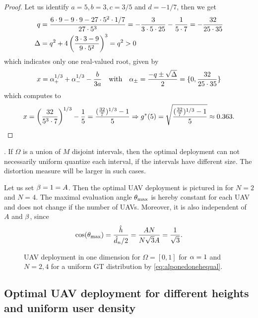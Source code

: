 \documentclass[smallabstract,smallcaptions]{dccpaper}
\newenvironment{remark}{\par\vspace{1.5ex}\noindent{\em Remark\/}.}{\par\vspace{1.5ex}}
\begin{document}
\begin{proof}
%
Let us identify $a=5,b=3,c=3/5$ and $d=-1/7$, then we get
%
\begin{align}
  q&=\frac{6\cdot 9-9\cdot 9 - 27\cdot 5^2\cdot1/7}{27\cdot 5^3}
  =-\frac{3}{3\cdot 5\cdot 25} -\frac{1}{5\cdot 7}=-\frac{32}{25\cdot35}\\
  \Delta&=q^2 + 4 \left(\frac{3\cdot 3 -9}{9\cdot 5^2}\right)^3=q^2>0
\end{align}
%
which indicates only one real-valued root, given by
%
\begin{align}
  x=\alpha_+^{1/3}+\alpha_-^{1/3}-\frac{b}{3a} 
  \quad\text{with}\quad  \alpha_{\pm}=\frac{-q\pm\sqrt{\Delta}}{2} = \{0, \frac{32}{25\cdot 35} \}
\end{align}
%
which computes to
%
\begin{align}
  x=\left( \frac{32}{5^3\cdot 7}\right)^{1/3}- \frac{1}{5}
  =\frac{(\frac{32}{7})^{1/3}-1}{5} \Rightarrow g^*(5)=\sqrt{\frac{(\frac{32}{7})^{1/3}-1}{5}} \approx 0.363.
\end{align}
%
\end{proof}
\color{black}
%
\begin{remark}
  If $\Omega$ is a union of $M$ disjoint intervals, then the optimal deployment can not necessarily uniform quantize
  each interval, if the intervals have different size. 
  The distortion measure will be larger in such cases.
\end{remark}

Let us set $\beta=1=A$. Then the optimal UAV deployment is pictured in  for $N=2$ and $N=4$. The
maximal evaluation angle $\theta_{\text{max}}$ is hereby constant for each UAV and does not change if the number of UAVs.
Moreover, it is also independent of $A$ and $\beta$, since
%
\begin{align}
  \cos(\theta_\text{max})= \frac{\hat{h}}{\hat{d}_n/2}= \frac{AN}{N\sqrt{3}A}= \frac{1}{\sqrt{3}}.
\end{align}
% 
\begin{figure}
    \centering
    \def\svgwidth{.9\textwidth} \scriptsize{
      }
      \caption{UAV deployment in one dimension for $\Omega=[0,1]$ for $\alpha=1$ and $N=2,4$ for a uniform GT distribution
      by \eqref{eq:alponedonehequal}.}
      \label{fig:uavonedim}
\end{figure}
%
\subsection{Optimal UAV deployment for different heights and uniform user density}
\end{document}
